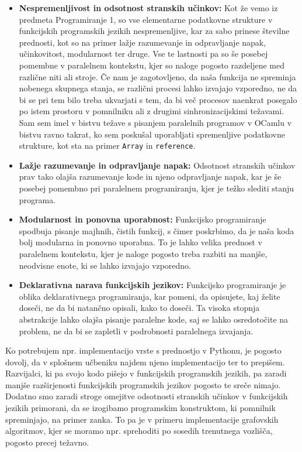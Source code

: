 \documentclass[mat1, tisk]{fmfdelo}
\begin{document}
\begin{itemize} \label{itemize:prednosti_funkcijskega_programiranja}
  \item \textbf{Nespremenljivost in odsotnost stranskih učinkov:} 
    Kot že vemo iz predmeta Programiranje 1, so vse 
    elementarne podatkovne strukture v funkcijskih programskih jezikih nespremenljive, kar za sabo prinese številne
    prednosti, kot so na primer lažje razumevanje in odpravljanje napak, učinkovitost, modularnost 
    ter druge. Vse te lastnosti pa so še posebej pomembne v paralelnem kontekstu, kjer so naloge pogosto razdeljene med
    različne niti ali stroje. Če nam je zagotovljeno, da naša funkcija ne spreminja nobenega skupnega stanja, se
    različni procesi lahko izvajajo vzporedno, ne da bi se pri tem bilo treba ukvarjati s tem, da bi več procesov
    naenkrat posegalo po istem prostoru v pomnilniku ali z drugimi sinhronizacijskimi težavami.
    Sam sem imel v bistvu težave s pisanjem paralelnih programov v OCamlu v bistvu ravno takrat, ko sem
    poskušal uporabljati spremenljive podatkovne strukture, kot sta na primer \texttt{Array} in \texttt{reference}.

  \item \textbf{Lažje razumevanje in odpravljanje napak:} 
    Odsotnost stranskih učinkov prav tako olajša razumevanje kode in njeno odpravljanje napak, kar je še posebej
    pomembno pri paralelnem programiranju, kjer je težko slediti stanju programa.

  \item \textbf{Modularnost in ponovna uporabnost:}
    Funkcijsko programiranje spodbuja pisanje majhnih, čistih funkcij, s čimer poskrbimo, da je naša koda bolj 
    modularna in ponovno uporabna. To je lahko velika prednost v paralelnem kontekstu,
    kjer je naloge pogosto treba razbiti na manjše, neodvisne enote, ki se lahko izvajajo vzporedno.

  \item \textbf{Deklarativna narava funkcijskih jezikov:} 
    Funkcijsko programiranje je oblika deklarativnega programiranja, kar pomeni, da opisujete, kaj želite doseči, 
    ne da bi natančno opisali, kako to doseči. Ta visoka stopnja abstrakcije lahko olajša pisanje paralelne kode, 
    saj se lahko osredotočite na problem, ne da bi se zapletli v podrobnosti paralelnega izvajanja.
\end{itemize}

Ko potrebujem npr. implementacijo vrste s prednostjo v Pythonu, je pogosto dovolj, da v splošnem učbeniku najdem njeno
implementacijo ter to prepišem. Razvijalci, ki pa svojo kodo pišejo v funkcijskih programskih jezikih, pa zaradi manjše
razširjenosti funkcijskih programskih jezikov pogosto te sreče nimajo. 
Dodatno smo zaradi stroge omejitve odsotnosti stranskih učinkov v funkcijskih jezikih primorani, da se izogibamo
programskim konstruktom, ki pomnilnik spreminjajo, na primer zanka. To pa je v primeru implementacije grafovskih
algoritmov, kjer se moramo npr. sprehoditi po sosedih trenutnega vozlišča, pogosto precej težavno.
\end{document}
